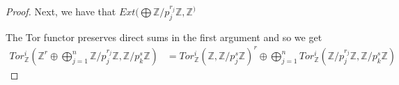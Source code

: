 \documentclass[12pt]{extarticle}
\newcommand{\Z}{\mathbb{Z}}
\newcommand{\<}{\langle}
\renewcommand{\>}{\rangle}
\theoremstyle{definition}
\begin{document}
\begin{proof}
  Next, we have that $Ext(\bigoplus \Z/p_j^{r_j} \Z, \Z^)$
  
  
  The Tor functor preserves direct sums in the first argument and so we get
  \begin{align*}
    Tor_{\Z}^i(\Z^r \oplus \bigoplus\limits_{j=1}^n \Z/p_j^{r_j}\Z, \Z/p_k^s\Z) 
    &= Tor_{\Z}^i(\Z, \Z/p_j^s\Z)^r \oplus \bigoplus\limits_{j=1}^n Tor_{\Z}^i(\Z/p_j^{r_j}\Z, \Z/p_k^s\Z)
  \end{align*}
\end{proof}
\end{document}
